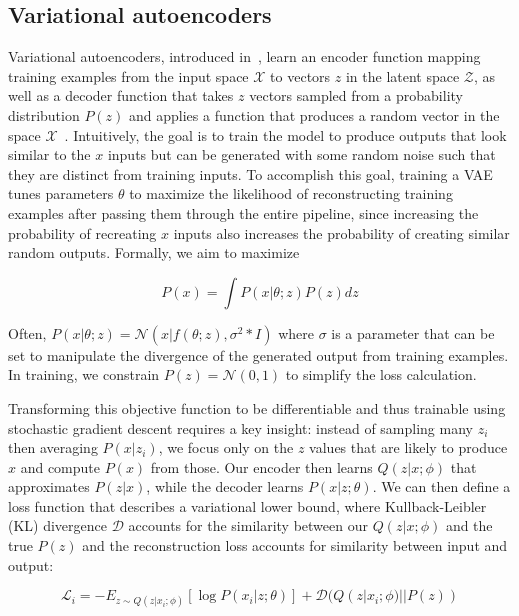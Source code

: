 \subsection{Variational autoencoders}
Variational autoencoders, introduced in~\cite{kingma2013auto}, learn an encoder function mapping training examples from the input space $\mathcal{X}$ to vectors $z$ in the latent space $\mathcal{Z}$, as well as a decoder function that takes $z$ vectors sampled from a probability distribution $P(z)$ and applies a function that produces a random vector in the space $\mathcal{X}$~\cite{doersch2016tutorial}.
Intuitively, the goal is to train the model to produce outputs that look similar to the $x$ inputs but can be generated with some random noise such that they are distinct from training inputs.
To accomplish this goal, training a VAE tunes parameters $\theta$ to maximize the likelihood of reconstructing training examples after passing them through the entire pipeline, since increasing the probability of recreating $x$ inputs also increases the probability of creating similar random outputs.
Formally, we aim to maximize

\begin{equation}
    P(x) = \int P(x|\theta; z) P(z) dz
\end{equation}

Often, $P(x|\theta; z) = \mathcal{N}(x|f(\theta; z), \sigma^2 *I)$ where $\sigma$ is a parameter that can be set to manipulate the divergence of the generated output from training examples. In training, we constrain $P(z) = \mathcal{N}(0, 1)$ to simplify the loss calculation. 

Transforming this objective function to be differentiable and thus trainable using stochastic gradient descent requires a key insight: instead of sampling many $z_i$ then averaging $P(x|z_i)$, we focus only on the $z$ values that are likely to produce $x$ and compute $P(x)$ from those.
Our encoder then learns $Q(z|x; \phi)$ that approximates $P(z|x)$, while the decoder learns $P(x|z; \theta)$.
We can then define a loss function that describes a variational lower bound, where Kullback-Leibler (KL) divergence $\mathcal{D}$ accounts for the similarity between our $Q(z|x; \phi)$ and the true $P(z)$ and the reconstruction loss accounts for similarity between input and output:

\begin{equation}
    \mathcal{L}_i = -E_{z\sim Q(z|x_i; \phi)} [\log P(x_i|z; \theta)] + \mathcal{D}(Q(z|x_i; \phi)||P(z))
\end{equation}

